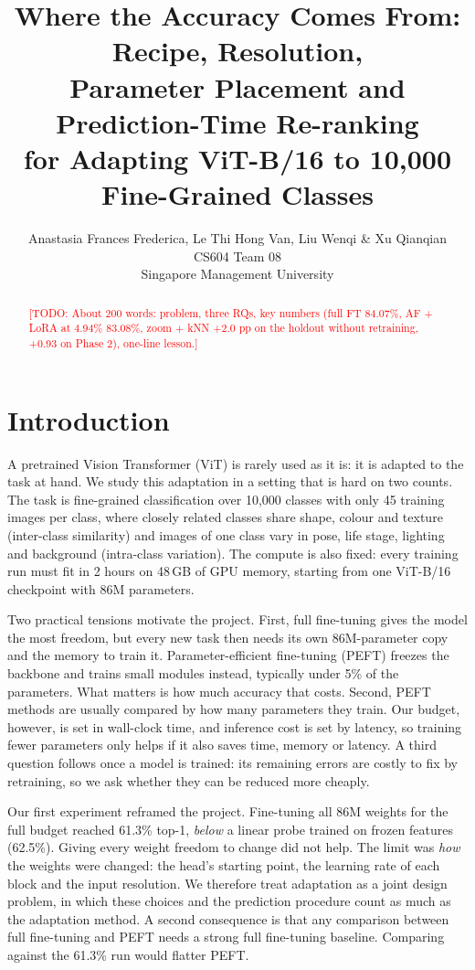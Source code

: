 \documentclass{article} %
\title{Where the Accuracy Comes From: Recipe, Resolution, \\
Parameter Placement and Prediction-Time Re-ranking \\
for Adapting ViT-B/16 to 10,000 Fine-Grained Classes}
\author{Anastasia Frances Frederica, Le Thi Hong Van, Liu Wenqi \& Xu Qianqian \\
CS604 Team 08 \\
Singapore Management University
}
\makeatletter
\newcommand{\todo}[1]{\textcolor{red}{[TODO: #1]}}
\let\course@origtitle\maketitle
\def\maketitle{\course@origtitle\fancyhead{}\pagestyle{fancy}}
\makeatother
\begin{document}
\maketitle

\begin{abstract}
\todo{About 200 words: problem, three RQs, key numbers (full FT 84.07\%, AF + LoRA
at 4.94\% 83.08\%, zoom + kNN +2.0 pp on the holdout without retraining, +0.93 on
Phase 2), one-line lesson.}
\end{abstract}

\section{Introduction}
\label{sec:intro}

A pretrained Vision Transformer (ViT) is rarely used as it is: it is adapted to the task
at hand. We study this adaptation in a setting that is hard on two counts. The task is
fine-grained classification over 10,000 classes with only 45 training images per class,
where closely related classes share shape, colour and texture (inter-class similarity) and
images of one class vary in pose, life stage, lighting and background (intra-class
variation). The compute is also fixed: every training run must fit in 2 hours on 48\,GB of
GPU memory, starting from one ViT-B/16 checkpoint with 86M parameters.

Two practical tensions motivate the project. First, full fine-tuning gives the model the
most freedom, but every new task then needs its own 86M-parameter copy and the memory to
train it. Parameter-efficient fine-tuning (PEFT) freezes the backbone and trains small
modules instead, typically under 5\% of the parameters. What matters is how much accuracy
that costs. Second, PEFT methods are usually compared by how many parameters they train.
Our budget, however, is set in wall-clock time, and inference cost is set by latency, so
training fewer parameters only helps if it also saves time, memory or latency. A third
question follows once a model is trained: its remaining errors are costly to fix by
retraining, so we ask whether they can be reduced more cheaply.

Our first experiment reframed the project. Fine-tuning all 86M weights for the full
budget reached 61.3\% top-1, \emph{below} a linear probe trained on frozen features
(62.5\%). Giving every weight freedom to change did not help. The limit was \emph{how}
the weights were changed: the head's starting point, the learning rate of each block and
the input resolution. We therefore treat adaptation as a joint design problem, in which
these choices and the prediction procedure count as much as the adaptation method. A
second consequence is that any comparison between full fine-tuning and PEFT needs a
strong full fine-tuning baseline. Comparing against the 61.3\% run would flatter PEFT.
\end{document}
